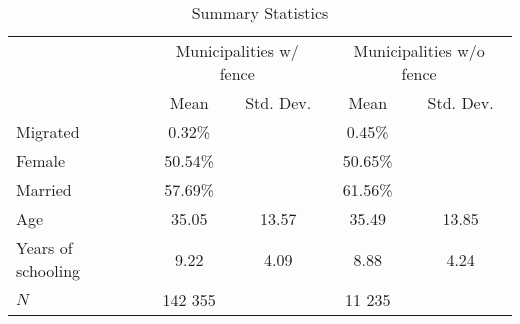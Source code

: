 \begin{table}

\caption{\label{tab:sum-stats}Summary Statistics}
\centering
\begin{tabular}[t]{lcccc}
\toprule
\multicolumn{1}{c}{} & \multicolumn{2}{c}{Municipalities w/ fence} & \multicolumn{2}{c}{Municipalities w/o fence} \\
\cmidrule(l{3pt}r{3pt}){2-3} \cmidrule(l{3pt}r{3pt}){4-5}
 & Mean & Std. Dev. & Mean & Std. Dev.\\
\midrule
Migrated & 0.32\% &  & 0.45\% & \\
\addlinespace
Female & 50.54\% &  & 50.65\% & \\
\addlinespace
Married & 57.69\% &  & 61.56\% & \\
\addlinespace
Age & 35.05 & 13.57 & 35.49 & 13.85\\
\addlinespace
Years of schooling & 9.22 & 4.09 & 8.88 & 4.24\\
\addlinespace\midrule
$N$ & 142 355 &  & 11 235 & \\
\bottomrule
\end{tabular}
\end{table}
